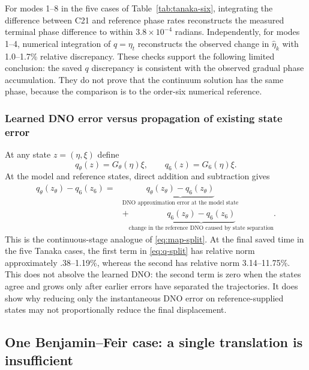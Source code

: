 \documentclass[11pt]{article}
\begin{document}
For modes 1--8 in the five cases of Table~\ref{tab:tanaka-six}, integrating
the difference between C21 and reference phase rates reconstructs the measured
terminal phase difference to within $3.8\times10^{-4}$ radians.  Independently,
for modes 1--4, numerical integration of $q=\eta_t$ reconstructs the observed
change in $\widehat\eta_k$ with 1.0--1.7\% relative discrepancy.  These checks
support the following limited conclusion: the saved $q$ discrepancy is
consistent with the observed gradual phase accumulation.  They do not prove
that the continuum solution has the same phase, because the comparison is to
the order-six numerical reference.

\subsubsection{Learned DNO error versus propagation of existing state error}

At any state $z=(\eta,\xi)$ define
\begin{equation}
  q_\theta(z)=G_\theta(\eta)\xi,
  \qquad q_6(z)=G_6(\eta)\xi.
\end{equation}
At the model and reference states, direct addition and subtraction gives
\begin{equation}
\begin{split}
 q_\theta(z_\theta)-q_6(z_6)
 ={}&\underbrace{q_\theta(z_\theta)-q_6(z_\theta)}_{
       \text{DNO approximation error at the model state}}\\
 &+\underbrace{q_6(z_\theta)-q_6(z_6)}_{
       \text{change in the reference DNO caused by state separation}}.
\end{split}
\label{eq:q-split}
\end{equation}
This is the continuous-stage analogue of \eqref{eq:map-split}.  At the final
saved time in the five Tanaka cases, the first term in \eqref{eq:q-split} has
relative norm approximately .38--1.19\%, whereas the second has relative norm
3.14--11.75\%.  This does not absolve the learned DNO: the second term is zero
when the states agree and grows only after earlier errors have separated the
trajectories.  It does show why reducing only the instantaneous DNO error on
reference-supplied states may not proportionally reduce the final displacement.

\subsection{One Benjamin--Feir case: a single translation is insufficient}
\end{document}
